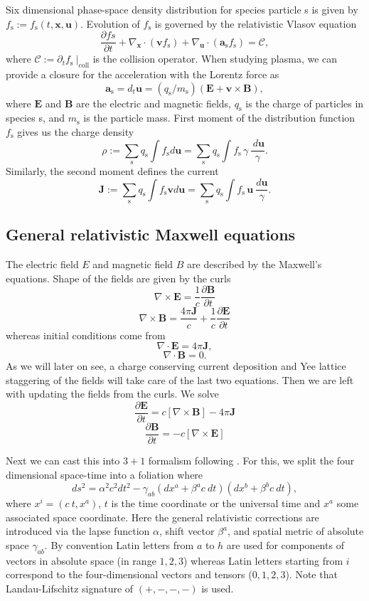 \documentclass{aa}
\newcommand{\be}{\begin{equation}}
\newcommand{\ee}{\end{equation}}
\newcommand{\D}[2]{\ensuremath{\frac{\partial {#1} }{\partial {#2} }}}
\newcommand{\f}[1]{\ensuremath{f_{\mathrm{ {#1} }}}}
\renewcommand{\vec}[1]{\ensuremath{\boldsymbol{#1}}}
\begin{document}
Six dimensional phase-space density distribution for species particle s is given by $\f{s} := \f{s}(t, \vec{x}, \vec{u})$.
Evolution of $\f{s}$ is governed by the relativistic Vlasov equation
\be\label{eq:vlasov}
\D{f{s}}{t} + \nabla_{\vec{x}} \cdot (\vec{v} \f{s}) + \nabla_{\vec{u}} \cdot (\vec{a}_{\mathrm{s}} \f{s} ) = \mathcal{C},
\ee
where $\mathcal{C} := \partial_t \f{s} ~|_{\mathrm{coll}}$ is the collision operator.
When studying plasma, we can provide a closure for the acceleration with the Lorentz force as 
\be
\vec{a}_{\mathrm{s}} = d_t \vec{u} = (q_{\mathrm{s}} / m_{\mathrm{s}} )(\vec{E} + \vec{v} \times \vec{B}),
\ee
where $\vec{E}$ and $\vec{B}$ are the electric and magnetic fields, $q_{\mathrm{s}}$ is the charge of particles in species s, and $m_{\mathrm{s}}$ is the particle mass.
First moment of the distribution function $\f{s}$ gives us the charge density
\be
\rho := \sum_{\mathrm{s}} q_{\mathrm{s}} \int \f{s} d\vec{u} = \sum_{\mathrm{s}} q_{\mathrm{s}} \int \f{s} \, \gamma \, \frac{ ~d\vec{u}}{\gamma}.
\ee
Similarly, the second moment defines the current
\be
\vec{J} := \sum_{\mathrm{s}} q_{\mathrm{s}} \int \f{s} \vec{v} d\vec{u} = \sum_{\mathrm{s}} q_{\mathrm{s}} \int \f{s} \, \vec{u} ~\frac{ d\vec{u}}{\gamma}.
\ee



\subsection{General relativistic Maxwell equations}
The electric field $E$ and magnetic field $B$ are described by the Maxwell's equations.
Shape of the fields are given by the curls
\be
\nabla \times \vec{E} = \frac{1}{c} \frac{\partial \vec{B}} {\partial t}
\ee
\be
\nabla \times \vec{B} = \frac{4 \pi \vec{J}}{c} + \frac{1}{c} \frac{\partial \vec{E}} {\partial t}
\ee
whereas initial conditions come from
\be
\nabla \cdot \vec{E} = 4\pi\vec{J},
\ee
\be
\nabla \cdot \vec{B} = 0.
\ee
As we will later on see, a charge conserving current deposition and Yee lattice staggering of the fields will take care of the last two equations.
Then we are left with updating the fields from the curls.
We solve
\be
\frac{\partial \vec{E}}{\partial t} = c [ \nabla \times \vec{B}] - 4\pi \vec{J}
\ee
\be
\frac{\partial \vec{B}}{\partial t} = -c[ \nabla \times \vec{E}]
\ee

Next we can cast this into $3+1$ formalism following \citealt{P15}.
For this, we split the four dimensional space-time into a foliation where 
\be
ds^2 = \alpha^2 c^2 dt^2 - \gamma_{ab}(dx^a + \beta^a c~dt)(dx^b + \beta^b c~dt),
\ee
where $x^i = (c~t, x^a)$, $t$ is the time coordinate or the universal time and $x^a$ some associated space coordinate.
Here the general relativistic corrections are introduced via the lapse function $\alpha$, shift vector $\beta^a$, and spatial metric of absolute space $\gamma_{ab}$.
By convention Latin letters from $a$ to $h$ are used for components of vectors in absolute space (in range ${1,2,3}$) whereas Latin letters starting from $i$ correspond to the four-dimensional vectors and tensors (${0,1,2,3}$).
Note that Landau-Lifschitz signature of $(+,-,-,-)$ is used.
\end{document}
